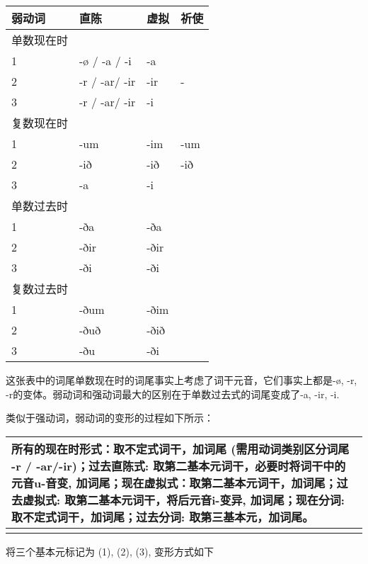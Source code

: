 \begin{longtable}{llll}
  \toprule
  弱动词   & 直陈            & 虚拟   & 祈使  \\
  \midrule
  \endhead
  \bottomrule
  \endfoot
  单数现在时 &               &      &     \\
  1     & -ø / -a / -i  & -a   &     \\
  2     & -r / -ar/ -ir & -ir  & -   \\
  3     & -r / -ar/ -ir & -i   &     \\
  复数现在时 &               &      &     \\
  1     & -um           & -im  & -um \\
  2     & -ið           & -ið  & -ið \\
  3     & -a            & -i   &     \\
  单数过去时 &               &      &     \\
  1     & -ða           & -ða  &     \\
  2     & -ðir          & -ðir &     \\
  3     & -ði           & -ði  &     \\
  复数过去时 &               &      &     \\
  1     & -ðum          & -ðim &     \\
  2     & -ðuð          & -ðið &     \\
  3     & -ðu           & -ði  &     \\
\end{longtable}

这张表中的词尾单数现在时的词尾事实上考虑了词干元音，它们事实上都是-ø,
-r, -r的变体。弱动词和强动词最大的区别在于单数过去式的词尾变成了-a, -ir,
-i.

类似于强动词，弱动词的变形的过程如下所示：

\begin{longtable}{l}
  \toprule
  所有的现在时形式：取不定式词干，加词尾 (需用动词类别区分词尾 -r / -ar/-ir)；过去直陈式: 取第二基本元词干，必要时将词干中的元音u-音变, 加词尾；现在虚拟式：取第二基本元词干，加词尾；过去虚拟式: 取第二基本元词干，将后元音i-变异, 加词尾；现在分词: 取不定式词干，加词尾；过去分词: 取第三基本元，加词尾。 \\
  \midrule
  \endhead
  \bottomrule
  \endfoot
\end{longtable}

将三个基本元标记为 (1), (2), (3), 变形方式如下

